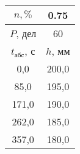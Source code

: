 \begin{tabular}[t]{|c|c|}
\hline
$n, \%$ & 0.75 \\
\hline
$P$, дел & 60 \\
\hline
$t_{абс}$, с & $h$, мм \\ 
\hline
0,0 & 200,0 \\ 
85,0 & 195,0 \\ 
171,0 & 190,0 \\ 
262,0 & 185,0 \\ 
357,0 & 180,0 \\ 
\hline
\end{tabular}